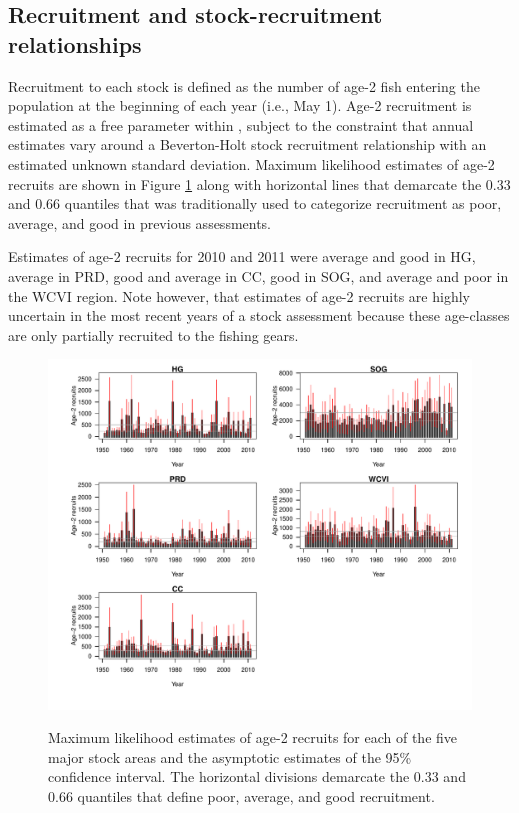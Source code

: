 \subsection{Recruitment and stock-recruitment relationships}

Recruitment to each stock is defined as the number of age-2 fish entering the population at the beginning of each year (i.e., May 1). Age-2 recruitment is estimated as a free parameter within \iscam, subject to the constraint that annual estimates vary around a Beverton-Holt stock recruitment relationship with an estimated unknown standard deviation.  Maximum likelihood estimates of age-2 recruits are shown in Figure \ref{PartII:Results:FigAge2Recruits} along with horizontal lines that demarcate the 0.33 and 0.66 quantiles that was traditionally used to categorize recruitment as poor, average, and good in previous assessments.

Estimates of age-2 recruits for 2010 and 2011 were average and good  in HG, average in PRD, good and average in CC, good in SOG, and average and poor in the WCVI region.  Note however, that estimates of age-2 recruits are highly uncertain in the most recent years of a stock assessment because these age-classes are only partially recruited to the fishing gears.


\begin{figure}[!tbp]
	\includegraphics[width=\textwidth]{../FIGS/qPriorFigs/iscam_fig_recruitment.pdf}\\
	\caption{Maximum likelihood estimates of age-2 recruits for each of the five major stock areas and the asymptotic estimates of the 95\% confidence interval.  The horizontal divisions demarcate the 0.33 and 0.66 quantiles that define poor, average, and good recruitment.}\label{PartII:Results:FigAge2Recruits}
\end{figure}

